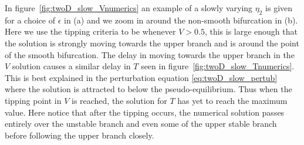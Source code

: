 In figure~\ref{fig:twoD_slow_Vnumerics} an example of a slowly varying $\eta_2$ is given for a choice of $\epsilon$ in (a) and we zoom in around the non-smooth bifurcation in (b). Here we use the tipping criteria to be whenever $V>0.5$, this is large enough that the solution is strongly moving towards the upper branch and is around the point of the smooth bifurcation. The delay in moving towards the upper branch in the $V$ solution causes a similar delay in $T$ seen in figure~\ref{fig:twoD_slow_Tnumerics}. This is best explained in the perturbation equation \eqref{eq:twoD_slow_pertub} where the solution is attracted to below the pseudo-equilibrium. Thus when the tipping point in $V$ is reached, the solution for $T$ has yet to reach the maximum value. Here notice that after the tipping occurs, the numerical solution passes entirely over the unstable branch and even some of the upper stable branch before following the upper branch closely.

